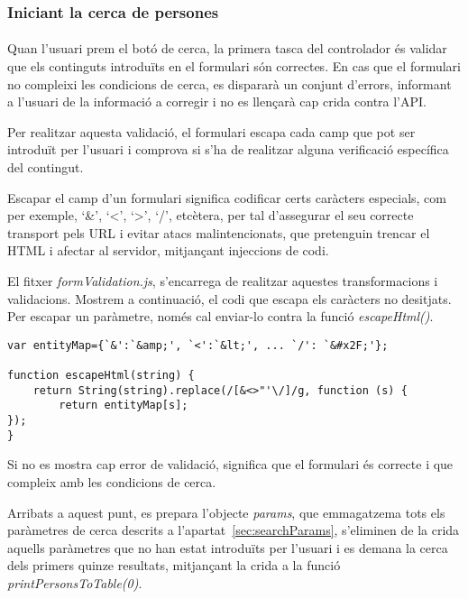 \subsubsection{Iniciant la cerca de persones}

\paragraph{}
Quan l'usuari prem el botó de cerca, la primera tasca del controlador és validar que els continguts introduïts en el formulari són correctes. En cas que el formulari no compleixi les condicions de cerca, es dispararà un conjunt d'errors, informant a l'usuari de la informació a corregir i no es llençarà cap crida contra l'API.

Per realitzar aquesta validació, el formulari escapa cada camp que pot ser introduït per l'usuari i comprova si s'ha de realitzar alguna verificació específica del contingut.

Escapar el camp d'un formulari significa codificar certs caràcters especials, com per exemple, `\&', `<', `>', `/', etcètera, per tal d'assegurar el seu correcte transport pels URL i evitar atacs malintencionats, que pretenguin trencar el HTML i afectar al servidor, mitjançant injeccions de codi.

El fitxer \emph{formValidation.js}, s'encarrega de realitzar aquestes transformacions i validacions. Mostrem a continuació, el codi que escapa els caràcters no desitjats. Per escapar un paràmetre, només cal enviar-lo contra la funció \emph{escapeHtml()}.

\begin{lstlisting}[style=rawOwn,caption={Funcio \emph{escapeHtml()} i la variable \emph{entityMap}}]
var entityMap={`&':`&amp;', `<':`&lt;', ... `/': `&#x2F;'};

function escapeHtml(string) {
    return String(string).replace(/[&<>"'\/]/g, function (s) {
        return entityMap[s];
});
}
\end{lstlisting}

Si no es mostra cap error de validació, significa que el formulari és correcte i que compleix amb les condicions de cerca.

Arribats a aquest punt, es prepara l'objecte \emph{params}, que emmagatzema tots els paràmetres de cerca descrits a l'apartat~\ref{sec:searchParams}, s'eliminen de la crida aquells pa\-rà\-me\-tres que no han estat introduïts per l'usuari i es demana la cerca dels primers quinze resultats, mitjançant la crida a la funció \emph{print\-Persons\-To\-Table(0)}.
